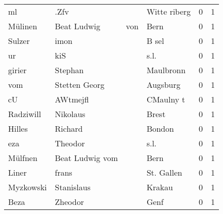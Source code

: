 \begin{tabular}{llllrr}
                       ml &                               .Zfv &             &                                Witte riberg &          0 &         1 \\
                  Mülinen &                        Beat Ludwig &         von &                                        Bern &          0 &         1 \\
                   Sulzer &                               imon &             &                                       B sel &          0 &         1 \\
                       ur &                                kiS &             &                                        s.l. &          0 &         1 \\
                   girier &                            Stephan &             &                                   Maulbronn &          0 &         1 \\
                      vom &                      Stetten Georg &             &                                    Augsburg &          0 &         1 \\
                       cU &                           AWtmejfl &             &                                   CMaulny t &          0 &         1 \\
                Radziwill &                           Nikolaus &             &                                       Brest &          0 &         1 \\
                   Hilles &                            Richard &             &                                      Bondon &          0 &         1 \\
                      eza &                            Theodor &             &                                        s.l. &          0 &         1 \\
                  Mülfnen &                    Beat Ludwig vom &             &                                        Bern &          0 &         1 \\
                    Liner &                              frans &             &                                  St. Gallen &          0 &         1 \\
                Myzkowski &                         Stanislaus &             &                                      Krakau &          0 &         1 \\
                     Beza &                            Zheodor &             &                                        Genf &          0 &         1 \\

\end{tabular}
